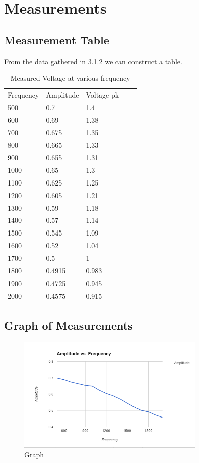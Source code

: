\documentclass[12pt]{article}
\begin{document}
\section{Measurements}
\subsection{Measurement Table}

From the data gathered in 3.1.2 we can construct a table.
\begin{table}[h!]
	\centering
	\caption{Measured Voltage at various frequency}
	\label{my-label}
	\begin{tabular}{lllll}

		Frequency & Amplitude & Voltage pk &  &  \\
		500       & 0.7       & 1.4        &  &  \\
		600       & 0.69      & 1.38       &  &  \\
		700       & 0.675     & 1.35       &  &  \\
		800       & 0.665     & 1.33       &  &  \\
		900       & 0.655     & 1.31       &  &  \\
		1000      & 0.65      & 1.3        &  &  \\
		1100      & 0.625     & 1.25       &  &  \\
		1200      & 0.605     & 1.21       &  &  \\
		1300      & 0.59      & 1.18       &  &  \\
		1400      & 0.57      & 1.14       &  &  \\
		1500      & 0.545     & 1.09       &  &  \\
		1600      & 0.52      & 1.04       &  &  \\
		1700      & 0.5       & 1          &  &  \\
		1800      & 0.4915    & 0.983      &  &  \\
		1900      & 0.4725    & 0.945      &  &  \\
		2000      & 0.4575    & 0.915      &  & 
	\end{tabular}
\end{table}
\newpage
\subsection{Graph of Measurements}	

\begin{figure}[h]
	\centering
	\includegraphics[width=0.8\textwidth]{graph.png}
	\caption{Graph}
	\label{fig:graph}
\end{figure}	
\end{document}
